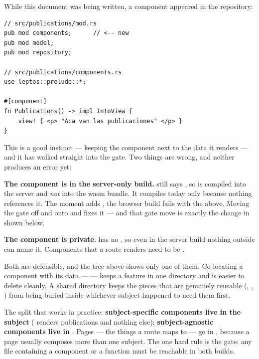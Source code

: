 \begin{verified}
While this document was being written, a component appeared in the repository:

\begin{lstlisting}[style=rs]
// src/publications/mod.rs
pub mod components;      // <-- new
pub mod model;
pub mod repository;

// src/publications/components.rs
use leptos::prelude::*;

#[component]
fn Publications() -> impl IntoView {
    view! { <p> "Aca van las publicaciones" </p> }
}
\end{lstlisting}

This is a good instinct --- keeping the component next to the data it renders --- and it has walked
straight into the gate. Two things are wrong, and neither produces an error yet:

\textbf{The component is in the server-only build.}  still says
, so  is compiled into
the server and \emph{not} into the wasm bundle. It compiles today only because nothing references
it. The moment  adds , the browser build fails with the
 above. Moving the gate off  and onto  and
 fixes it --- and that gate move is exactly the change in
 shown below.

\textbf{The component is private.}  has no , so even in the
server build nothing outside  can name it. Components that a route renders
need to be .
\end{verified}

\begin{why}
Both are defensible, and the tree above shows only one of them. Co-locating a component with its
data ---  --- keeps a feature in one directory and is easier to
delete cleanly. A shared  directory keeps the pieces that are genuinely reusable
(, , ) from being buried inside whichever subject
happened to need them first.

The split that works in practice: \textbf{subject-specific components live in the subject}
( renders publications and nothing else);
\textbf{subject-agnostic components live in }. Pages --- the things a route maps to ---
go in , because a page usually composes more than one subject. The one hard rule is
the gate: any file containing a component or a \code{\#[server]} function must be reachable in
both builds.
\end{why}

